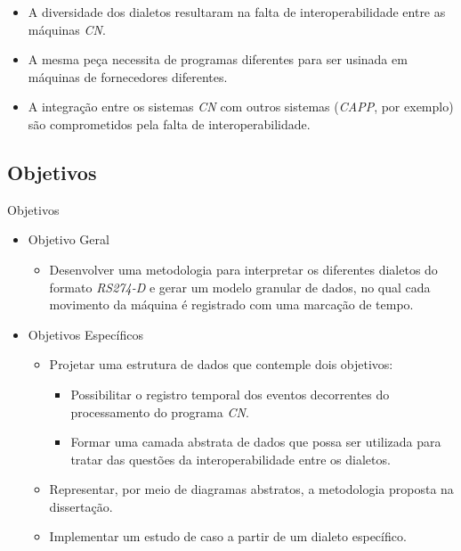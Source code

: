 \documentclass[aspectratio=169]{beamer}
\begin{document}
{\begin{frame}
\begin{itemize}
    \item {
      A diversidade dos dialetos resultaram na falta de interoperabilidade
      entre as máquinas \emph{CN}.
    }

    \item {
      A mesma pe\c ca necessita de programas diferentes para ser usinada 
      em m\'aquinas de fornecedores diferentes.
    }

    \item {
      A integração entre os sistemas \emph{CN} com outros sistemas 
      (\emph{CAPP}, por exemplo) são comprometidos pela falta de 
      interoperabilidade.
    }

  \end{itemize} 

\end{frame}


\subsection{Objetivos}

\begin{frame}{Objetivos}

  \begin{itemize}

    \item Objetivo Geral
      \begin{itemize}
        \item { 
          Desenvolver uma metodologia para interpretar os diferentes dialetos 
          do formato \emph{RS274-D} e gerar um modelo granular de dados, 
          no qual cada movimento da m\'aquina \'e registrado com uma marcação 
          de tempo.
        }
      \end{itemize}
    \vspace{3mm}
    \item Objetivos Específicos
      \begin{itemize}
        \item Projetar uma estrutura de dados que contemple dois objetivos:
        \begin{itemize}
            \item Possibilitar o registro temporal dos eventos decorrentes do 
                  processamento do programa \emph{CN}.
            \item Formar uma camada abstrata de dados que possa ser utilizada
                  para tratar das questões da interoperabilidade entre os 
                  dialetos.
        \end{itemize}
        \item Representar, por meio de diagramas abstratos, a metodologia proposta na dissertação.
        \item Implementar um estudo de caso a partir de um dialeto específico.
    \end{itemize}


\end{itemize}
\end{frame}}
\end{document}
